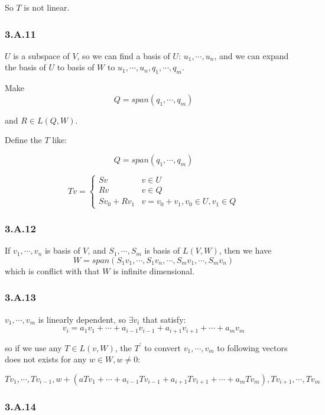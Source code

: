 So $T$ is not linear.

\subsubsection*{3.A.11}

$U$ is a subspace of $V$, so we can find a basis of $U$: $u_{1}, \cdots, u_{n}$, and we can expand the basis of $U$ to basis of $W$ to $u_{1}, \cdots, u_{n}, q_{1}, \cdots, q_{m} $.

Make 
\[Q = span(q_{1}, \cdots, q_{m})\]

and $R\in L(Q, W)$.

Define the $T$ like:

\[Q = span(q_{1}, \cdots, q_{m})\]

 \[
    Tv=\left\{
 \begin{array}{ll}
   Sv    &    v\in U \\
   Rv    &    v \in Q \\
   Sv_{0} + Rv_{1}    &    v = v_{0} + v_{1}, v_{0} \in U, v_{1} \in Q
  \end{array}
  \right.
  \]

\subsubsection*{3.A.12}

If $v_{1},\cdots, v_{n}$ is basis of $V$, and $S_{1}, \cdots, S_{m}$ is basis of $L(V, W)$, then we have 
\[W=span(S_{1}v_{1}, \cdots, S_{1}v_{n}, \cdots, S_{m}v_{1},\cdots, S_{m}v_{n})\]
which is conflict with that $W$ is infinite dimensional.

\subsubsection*{3.A.13}

$v_{1},\cdots,v_{m}$ is linearly dependent, so $\exists v_{i}$ that satisfy:
\[v_{i} = a_{1}v_{1} + \cdots + a_{i-1}v_{i-1} + a_{i+1}v_{i+1} + \cdots + a_{m}v_{m}\]

so if we use any $T\in L(v, W)$, the $T^{'}$ to convert $v_{1}, \cdots, v_{m}$ to following vectors does not exists for any  $w\in W,w\neq 0$:

\[Tv_{1}, \cdots, Tv_{i-1}, w + (aTv_{1}  + \cdots + a_{i-1}Tv_{i-1} + a_{i+1}Tv_{i+1} + \cdots + a_{m}Tv_{m}), Tv_{i+1}, \cdots, Tv_{m}\]


\subsubsection*{3.A.14}
 
